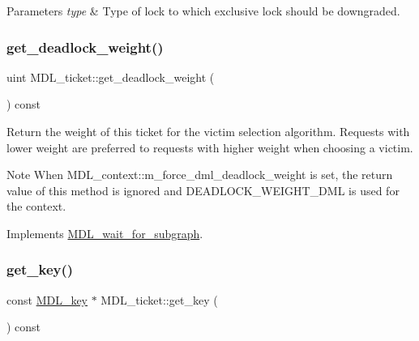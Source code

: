 \begin{DoxyParams}{Parameters}
{\em type} & Type of lock to which exclusive lock should be downgraded. \\
\hline
\end{DoxyParams}
\mbox{\label{classMDL__ticket_a9f3cbfd4b31f7715eae746904e840a02}} 
\subsubsection{\texorpdfstring{get\+\_\+deadlock\+\_\+weight()}{get\_deadlock\_weight()}}
{\footnotesize\ttfamily uint M\+D\+L\+\_\+ticket\+::get\+\_\+deadlock\+\_\+weight (\begin{DoxyParamCaption}{ }\end{DoxyParamCaption}) const\hspace{0.3cm}{\ttfamily [virtual]}}

Return the \textquotesingle{}weight\textquotesingle{} of this ticket for the victim selection algorithm. Requests with lower weight are preferred to requests with higher weight when choosing a victim.

\begin{DoxyNote}{Note}
When M\+D\+L\+\_\+context\+::m\+\_\+force\+\_\+dml\+\_\+deadlock\+\_\+weight is set, the return value of this method is ignored and D\+E\+A\+D\+L\+O\+C\+K\+\_\+\+W\+E\+I\+G\+H\+T\+\_\+\+D\+ML is used for the context. 
\end{DoxyNote}


Implements \mbox{\hyperlink{classMDL__wait__for__subgraph}{M\+D\+L\+\_\+wait\+\_\+for\+\_\+subgraph}}.

\mbox{\label{classMDL__ticket_ada5b318a2cce4e1daccf7b69b0e19284}} 
\subsubsection{\texorpdfstring{get\+\_\+key()}{get\_key()}}
{\footnotesize\ttfamily const \mbox{\hyperlink{structMDL__key}{M\+D\+L\+\_\+key}} $\ast$ M\+D\+L\+\_\+ticket\+::get\+\_\+key (\begin{DoxyParamCaption}{ }\end{DoxyParamCaption}) const}


